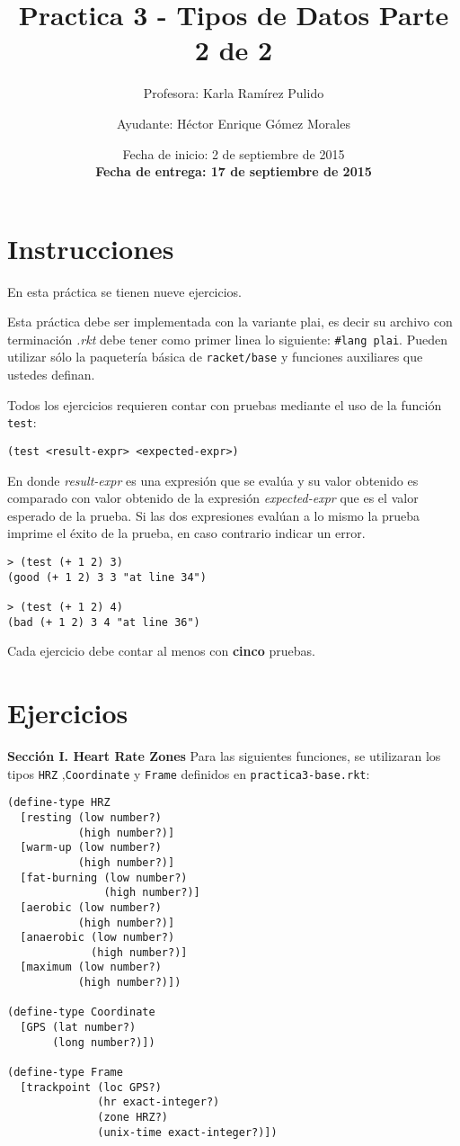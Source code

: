 \documentclass{article}
\author{Profesora: Karla Ramírez Pulido \and
  Ayudante: Héctor Enrique Gómez Morales}
\title{Practica 3 - Tipos de Datos Parte 2 de 2}
\date{Fecha de inicio: 2 de septiembre de 2015\\
  \textbf{Fecha de entrega: 17 de septiembre de 2015}}
\begin{document}
\maketitle
\section{Instrucciones}
En esta práctica se tienen nueve ejercicios.

Esta práctica debe ser implementada con la variante plai, es decir
su archivo con terminación \textit{.rkt} debe tener como primer linea lo siguiente:
\texttt{\#lang plai}. Pueden utilizar sólo la paquetería básica de
\texttt{racket/base} y funciones auxiliares que ustedes definan.

Todos los ejercicios requieren contar con pruebas mediante el uso de
la función \texttt{test}:
\begin{verbatim}
(test <result-expr> <expected-expr>)
\end{verbatim}

En donde \textit{result-expr} es una expresión que se evalúa y su valor obtenido
es comparado con valor obtenido de la expresión \textit{expected-expr} que es el
valor esperado de la prueba. Si las dos expresiones evalúan a lo mismo la prueba
imprime el éxito de la prueba, en caso contrario indicar un error.

\begin{verbatim}
> (test (+ 1 2) 3)
(good (+ 1 2) 3 3 "at line 34")

> (test (+ 1 2) 4)
(bad (+ 1 2) 3 4 "at line 36")
\end{verbatim}

Cada ejercicio debe contar al menos con \textbf{cinco} pruebas.

\section{Ejercicios}
\textbf{Sección I. Heart Rate Zones} Para las siguientes funciones, se utilizaran los tipos \verb;HRZ; ,\verb;Coordinate; y \verb;Frame; definidos en \verb;practica3-base.rkt;:
\begin{verbatim}
(define-type HRZ
  [resting (low number?)
           (high number?)]
  [warm-up (low number?)
           (high number?)]
  [fat-burning (low number?)
               (high number?)]
  [aerobic (low number?)
           (high number?)]
  [anaerobic (low number?)
             (high number?)]
  [maximum (low number?)
           (high number?)])

(define-type Coordinate
  [GPS (lat number?)
       (long number?)])

(define-type Frame
  [trackpoint (loc GPS?)
              (hr exact-integer?)
              (zone HRZ?)
              (unix-time exact-integer?)])
\end{verbatim}
\end{document}
